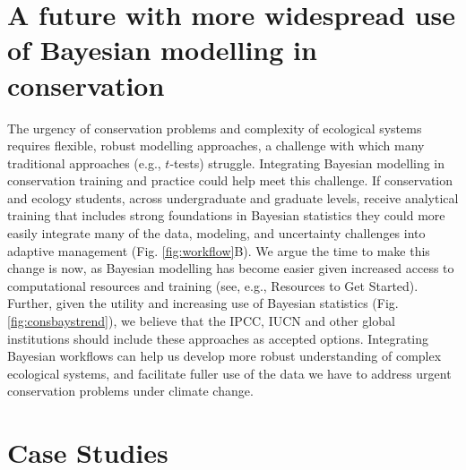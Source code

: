 \documentclass{article}
\begin{document}
\section* {A future with more widespread use of Bayesian modelling in conservation}
\par The urgency of conservation problems and complexity of  ecological systems requires flexible, robust modelling approaches, a challenge with which many traditional approaches (e.g., $t$-tests) struggle. Integrating Bayesian modelling in conservation training and practice could help meet this challenge. If conservation and ecology students, across undergraduate and graduate levels, receive analytical training that includes strong foundations in Bayesian statistics they could more easily integrate many of the data, modeling, and uncertainty challenges into adaptive management (Fig. \ref{fig:workflow}B). We argue the time to make this change is now, as Bayesian modelling has become easier given increased access to computational resources and training (see, e.g., Resources to Get Started). Further, given the utility and increasing use of Bayesian statistics (Fig. \ref{fig:consbaystrend}), we believe that the IPCC, IUCN and other global institutions should include these approaches as accepted options. Integrating Bayesian workflows can help us develop more robust understanding of complex ecological systems, and facilitate fuller use of the data we have to address urgent conservation problems under climate change.

\section* {Case Studies}
\end{document}
